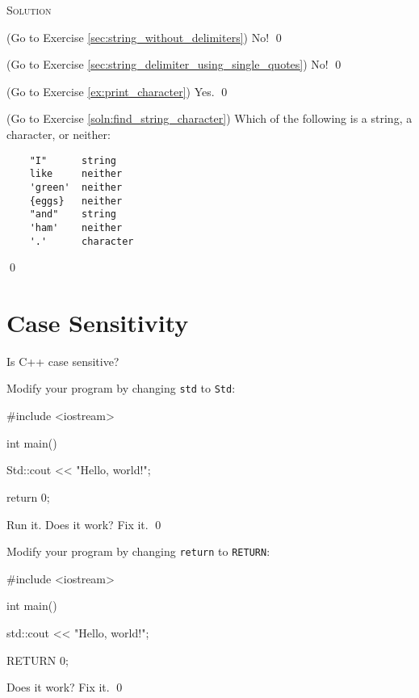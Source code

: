 \begin{console}[commandchars=\~\!\@]
\newpage
\textsc{Solution}

\begin{soln} \label{sec:string_without_delimiters_soln}
(Go to Exercise \ref{sec:string_without_delimiters})
No!
\qed
\end{soln}

\begin{soln} \label{sec:string_delimiter_using_single_quotes_soln}
(Go to Exercise \ref{sec:string_delimiter_using_single_quotes})
No!
\qed
\end{soln}

\begin{soln} \label{soln:print_character}
(Go to Exercise \ref{ex:print_character})
Yes.
\qed
\end{soln}

\begin{soln} \label{ex:find_string_character}
(Go to Exercise \ref{soln:find_string_character})
Which of the following is a string, a character, or neither:
\begin{verbatim}
    "I"      string
    like     neither
    'green'  neither
    {eggs}   neither
    "and"    string
    'ham'    neither
    '.'      character
\end{verbatim}
\qed
\end{soln}



\newpage\section{Case Sensitivity}

Is C++ case sensitive?

\begin{ex}
Modify your program by changing \verb!std! to \verb!Std!:
\begin{console}
#include <iostream>

int main()
{
    Std::cout << "Hello, world!\n";

    return 0;
}
\end{console}
Run it. Does it work? Fix it.
\qed
\end{ex}

\begin{ex}
Modify your program by changing \verb!return! to \verb!RETURN!:
\begin{console}
#include <iostream>

int main()
{
    std::cout << "Hello, world!\n";

    RETURN 0;
}
\end{console}
Does it work? Fix it.
\qed
\end{ex}



\end{console}
